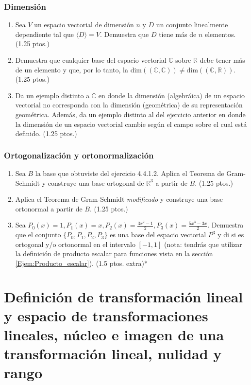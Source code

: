 \documentclass[12pt]{article}
\begin{document}
\subsubsection{Dimensión}
\begin{enumerate}
    \item Sea $V$ un espacio vectorial de dimensión $n$ y $D$ un conjunto linealmente dependiente tal que $\langle D \rangle =V$. Demuestra que $D$ tiene más de $n$ elementos. (1.25 ptos.)
    \item Demuestra que cualquier base del espacio vectorial $\mathbb{C}$ sobre $\mathbb{R}$ debe tener más de un elemento y que, por lo tanto, la $\text{dim}((\mathbb{C},\mathbb{C}))\neq \text{dim}((\mathbb{C},\mathbb{R})).$ (1.25 ptos.)
    \item Da un ejemplo distinto a $\mathbb{C}$ en donde la dimensión (algebráica) de un espacio vectorial no corresponda con la dimensión (geométrica) de su representación geométrica. Además, da un ejemplo distinto al del ejercicio anterior en donde la dimensión de un espacio vectorial cambie según el campo sobre el cual está definido. (1.25 ptos.)
\end{enumerate}


\subsubsection{Ortogonalización y ortonormalización}
\begin{enumerate}
    \item Sea $B$ la base que obtuviste del ejercicio 4.4.1.2. Aplica el Teorema de Gram-Schmidt y construye una base ortogonal de $\mathbb{R}^3$ a partir de $B$. (1.25 ptos.)
    \item Aplica el Teorema de Gram-Schmidt \emph{modificado} y construye una base ortonormal a partir de $B$. (1.25 ptos.)
\item Sea $P_0(x)=1, P_1(x)=x, P_2(x)=\frac{3x^2-1}{2}, P_3(x)=\frac{5x^3-3x}{2}.$ Demuestra que el conjunto $\{P_0,P_1,P_2,P_3\}$ es una base del espacio vectorial $P^3$ y di si es ortogonal y/o ortonormal en el intervalo $[-1,1]$ (nota: tendrás que utilizar la definición de producto escalar para funciones vista en la sección \ref{Ejem:Producto_escalar}). (1.5 ptos. extra)*
\end{enumerate}

\newpage
\section{Definición de transformación lineal y espacio de transformaciones lineales, núcleo e imagen de una transformación lineal, nulidad y rango}
\end{document}
